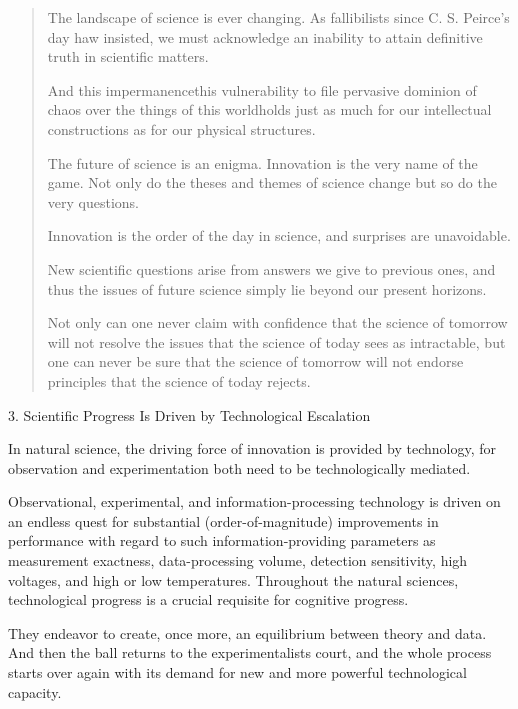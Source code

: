 \documentclass[a4paper]{Thesis}
\begin{document}
\begin{quotation}
		The landscape of science is ever changing. As fallibilists since C. S. Peirce's
		day haw insisted, we must acknowledge an inability to attain definitive truth in scientific
		matters.
		
		And
		this impermanencethis vulnerability to file pervasive dominion of chaos over the things of
		this worldholds just as much for our intellectual constructions as for our physical
		structures.
		
		The future of science is an enigma. Innovation is the very name of the game. Not only do
		the theses and themes of science change but so do the very questions.
		
		Innovation is the order of the day in science, and surprises are unavoidable.
		
		New scientific
		questions arise from answers we give to previous ones, and thus the issues of future
		science simply lie beyond our present horizons.
		
		Not only can one never claim with confidence that the science of tomorrow will not
		resolve the issues that the science of today sees as intractable, but one can never be
		sure that the science of tomorrow will not endorse principles that the science of today
		rejects.
		
	\end{quotation}
	3. Scientific Progress Is Driven by Technological Escalation
	
	In natural science, the driving force of innovation is provided
	by technology, for observation and experimentation both need to be technologically
	mediated.
	
	Observational, experimental, and information-processing
	technology is driven on an endless quest for substantial (order-of-magnitude)
	improvements in performance with regard to such information-providing parameters as
	measurement exactness, data-processing volume, detection sensitivity, high voltages,
	and high or low temperatures. Throughout the natural sciences, technological progress is
	a crucial requisite for cognitive progress.
	
	They endeavor to create, once more, an
	equilibrium between theory and data. And then the ball returns to the experimentalists
	court, and the whole process starts over again with its demand for new and more
	powerful technological capacity.
	
\end{document}
